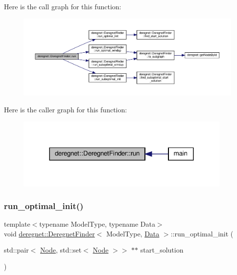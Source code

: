 Here is the call graph for this function\+:\nopagebreak
\begin{figure}[H]
\begin{center}
\leavevmode
\includegraphics[width=350pt]{classderegnet_1_1DeregnetFinder_a1a6119b306b54ff44d8c78f34fc037ab_cgraph}
\end{center}
\end{figure}
Here is the caller graph for this function\+:\nopagebreak
\begin{figure}[H]
\begin{center}
\leavevmode
\includegraphics[width=300pt]{classderegnet_1_1DeregnetFinder_a1a6119b306b54ff44d8c78f34fc037ab_icgraph}
\end{center}
\end{figure}
\mbox{\label{classderegnet_1_1DeregnetFinder_ae0335349d6a60ee204d10bf8b7366cfa}} 
\subsubsection{\texorpdfstring{run\+\_\+optimal\+\_\+init()}{run\_optimal\_init()}}
{\footnotesize\ttfamily template$<$typename Model\+Type, typename Data$>$ \\
void \hyperlink{classderegnet_1_1DeregnetFinder}{deregnet\+::\+Deregnet\+Finder}$<$ Model\+Type, \hyperlink{avgdrgnt_8cpp_a1d1235306db276e9b36acba1db1509e8}{Data} $>$\+::run\+\_\+optimal\+\_\+init (\begin{DoxyParamCaption}\item[{std\+::pair$<$ \hyperlink{namespacederegnet_a744bad34f2de9856d36715a445f027f3}{Node}, std\+::set$<$ \hyperlink{namespacederegnet_a744bad34f2de9856d36715a445f027f3}{Node} $>$$>$ $\ast$$\ast$}]{start\+\_\+solution }\end{DoxyParamCaption})\hspace{0.3cm}{\ttfamily [private]}}




